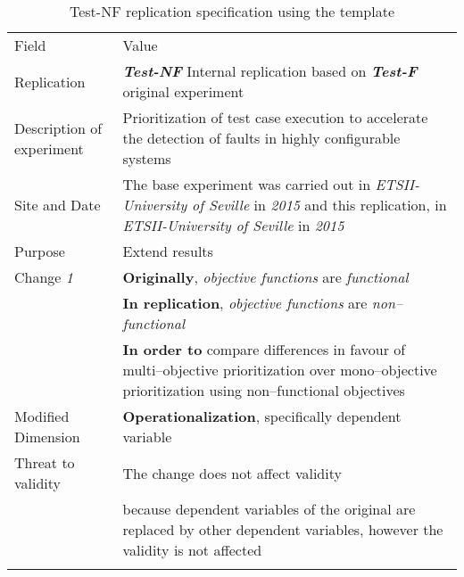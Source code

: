\begin{table*}[h]
  \caption{Test-NF replication specification using the template}
\label{tab:jap}
  \centering

\begin{tabularx}{\textwidth}{
  >{\hsize=0.25\hsize}X
  >{\hsize=0.8\hsize}X}
  
    \noalign{\smallskip}\hline\noalign{\smallskip}
  
  Field &  Value  \\ 
  \noalign{\smallskip}\hline\noalign{\smallskip}
 
 Replication &   \textbf{\emph{Test-NF}}   Internal replication based on \textbf{\emph{Test-F}}  original experiment   \\

 Description \newline of experiment &  Prioritization of test case execution to accelerate the detection of faults in highly configurable systems \\  
 
 Site and Date & The  base  experiment  was  carried  out  in \textit{ETSII-University of Seville} in \textit{2015} and this replication, in \textit{ETSII-University of Seville} in \textit{2015}  \\
    Purpose  &  Extend results \\  
\hline   
    Change \textit{1}   & \textbf{Originally}, \emph{objective functions} are \emph{functional} \\ & \textbf{In replication},  \emph{objective functions} are \emph{non–functional } \\& \textbf{In order to} compare  differences in favour of multi–objective prioritization
over mono–objective prioritization using non–functional objectives \\ 
    
    
    Modified Dimension & 
    \textbf{Operationalization}, specifically dependent variable \\   
    Threat to validity  &  The change does not affect validity \\
    & because dependent variables of the original are replaced by other dependent variables, however the validity is not affected
 \\ 
	
   	\noalign{\smallskip\smallskip}\hline
	\end{tabularx}  
\end{table*}
